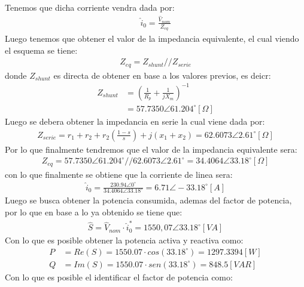 \documentclass[
  11pt,
  letterpaper,
   addpoints,
   answers
  ]{exam}
\begin{document}
\begin{questions}
\begin{solution}
        Tenemos que dicha corriente vendra dada por:
        \begin{align}
            \hat{i}_{0} = \frac{\hat{V}_{nom}}{Z_{eq}}
        \end{align}
        Luego tenemos que obtener el valor de la impedancia equivalente, el cual viendo el esquema se tiene:
        \begin{align}
            Z_{eq} = Z_{shunt} // Z_{serie}
        \end{align}
        donde $Z_{shunt}$ es directa de obtener en base a los valores previos, es deicr:
        \begin{align}
            Z_{shunt} &= \left( \frac{1}{R_{p}} + \frac{1}{jX_{m}}\right)^{-1}\\
            &= 57.7350 \angle 61.204^{\circ}[\Omega]
        \end{align}
        Luego se debera obtener la impedancia en serie la cual viene dada por:
        \begin{align}
            Z_{serie} = r_{1} + r_{2} + r_{2}\left(\frac{1-s}{s}\right) + j(x_{1} + x_{2}) = 62.6073 \angle 2.61^{\circ}[\Omega]
        \end{align}
        Por lo que finalmente tendremos que el valor de la impedancia equivalente sera:
        \begin{align}
            Z_{eq} = 57.7350 \angle 61.204^{\circ} // 62.6073 \angle 2.61^{\circ} = 34.4064 \angle 33.18^{\circ}[\Omega]
        \end{align}
        con lo que finalmente se obtiene que la corriente de linea sera:
        \begin{align}
            \hat{i}_{0} = \frac{230.94 \angle 0^{\circ}}{34.4064 \angle 33.18^{\circ}} = 6.71 \angle -33.18^{\circ}[A]
        \end{align}
        Luego se busca obtener la potencia consumida, ademas del factor de potencia, por lo que en base a lo ya obtenido se tiene que:
        \begin{align}
            \hat{S} = \hat{V}_{nom} \cdot \hat{i}_{0}^{*} = 1550,07 \angle 33.18^{\circ}[VA]
        \end{align}
        Con lo que es posible obtener la potencia activa y reactiva como:
        \begin{align}
            P &= Re(S) = 1550.07 \cdot cos(33.18^{\circ}) = 1297.3394[W]\\
            Q &= Im(S) = 1550.07 \cdot sen(33.18^{\circ}) = 848.5[VAR]
        \end{align}
        Con lo que es posible el identificar el factor de potencia como:

\end{solution}
\end{questions}
\end{document}
